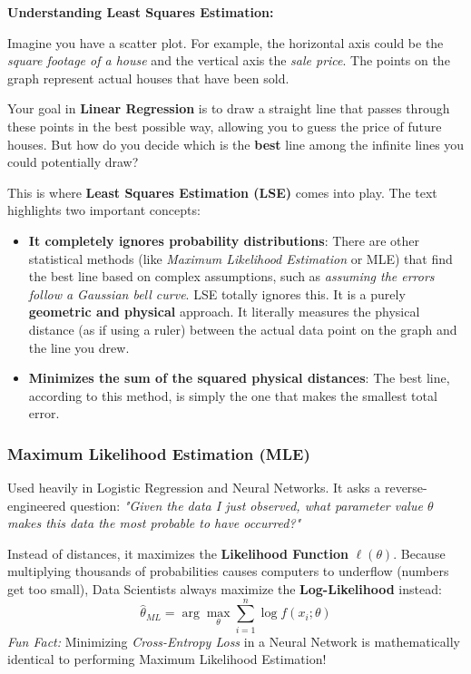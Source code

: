 \vspace{0.2cm}
\begin{example}{\textbf{Understanding Least Squares Estimation:}}


Imagine you have a scatter plot. For example, the horizontal axis could be the \textit{square footage of a house} and the vertical axis the \textit{sale price}. The points on the graph represent actual houses that have been sold.

Your goal in \textbf{Linear Regression} is to draw a straight line that passes through these points in the best possible way, allowing you to guess the price of future houses. But how do you decide which is the \textbf{best} line among the infinite lines you could potentially draw?

This is where \textbf{Least Squares Estimation (LSE)} comes into play. The text highlights two important concepts:
\begin{itemize}
    \item \textbf{It completely ignores probability distributions}: There are other statistical methods (like \textit{Maximum Likelihood Estimation} or MLE) that find the best line based on complex assumptions, such as \textit{assuming the errors follow a Gaussian bell curve}. LSE totally ignores this. It is a purely \textbf{geometric and physical} approach. It literally measures the physical distance (as if using a ruler) between the actual data point on the graph and the line you drew.
    \item \textbf{Minimizes the sum of the squared physical distances}: The best line, according to this method, is simply the one that makes the smallest total error.
\end{itemize}



\end{example}



\subsubsection{Maximum Likelihood Estimation (MLE)}
Used heavily in Logistic Regression and Neural Networks. It asks a reverse-engineered question: \textit{"Given the data I just observed, what parameter value $\theta$ makes this data the most probable to have occurred?"}

Instead of distances, it maximizes the \textbf{Likelihood Function} $\ell(\theta)$. Because multiplying thousands of probabilities causes computers to underflow (numbers get too small), Data Scientists always maximize the \textbf{Log-Likelihood} instead:
\begin{equation}
    \hat{\theta}_{ML} = \arg\max_{\theta} \sum_{i=1}^{n} \log f(x_i; \theta)
\end{equation}
\textit{Fun Fact:} Minimizing \textit{Cross-Entropy Loss} in a Neural Network is mathematically identical to performing Maximum Likelihood Estimation!

